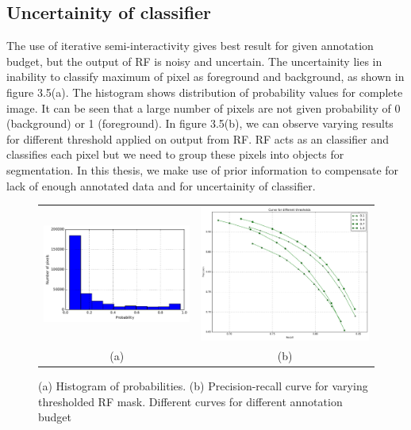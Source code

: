 \subsection{Uncertainity of classifier}
The use of iterative semi-interactivity gives best result for given annotation budget, but the output of RF is noisy and uncertain. The uncertainity lies in inability to classify maximum of pixel as foreground and background, as shown in figure 3.5(a). The histogram shows distribution of probability values for complete image. It can be seen that a large number of pixels are not given probability of 0 (background) or 1 (foreground). In figure 3.5(b), we can observe varying results for different threshold applied on output from RF. RF acts as an classifier and classifies each pixel but we need to group these pixels into objects for segmentation. In this thesis, we make use of prior information to compensate for lack of enough annotated data and for uncertainity of classifier.

\begin{figure}[h!] \label{fig:uncertain}
\begin{tabular}{cc}
 \includegraphics[width=0.5\linewidth]{figures/hist.pdf} & \includegraphics[width=0.5\linewidth]{figures/pr_curve.pdf} \\
  (a)  & (b) \\
\end{tabular}
\caption{(a) Histogram of probabilities. (b) Precision-recall curve for varying thresholded RF mask. Different curves for different annotation budget}
\end{figure}

